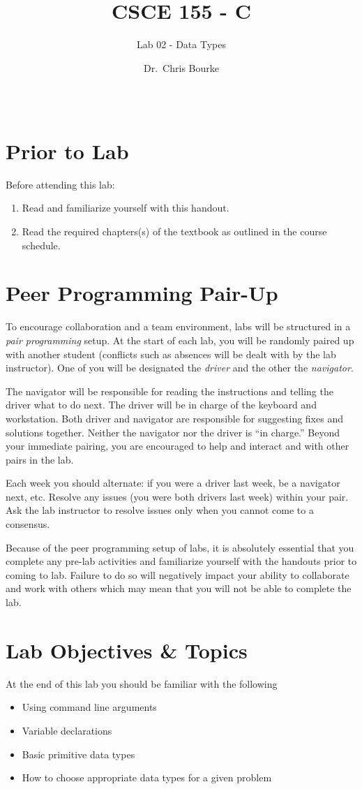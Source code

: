 \documentclass[12pt]{scrartcl}
\title{CSCE 155 - C}
\subtitle{Lab 02 - Data Types}
\author{Dr.\ Chris Bourke}
\date{~}
\begin{document}
\maketitle

\section*{Prior to Lab}

Before attending this lab:
\begin{enumerate}
  \item Read and familiarize yourself with this handout.
  \item Read the required chapters(s) of the textbook as 
  outlined in the course schedule.
\end{enumerate}

\section*{Peer Programming Pair-Up}

To encourage collaboration and a team environment, labs will be
structured in a \emph{pair programming} setup.  At the start of
each lab, you will be randomly paired up with another student
(conflicts such as absences will be dealt with by the lab instructor).
One of you will be designated the \emph{driver} and the other
the \emph{navigator}.

The navigator will be responsible for reading the instructions and
telling the driver what to do next.  The driver will be in charge of the
keyboard and workstation.  Both driver and navigator are responsible
for suggesting fixes and solutions together.  Neither the navigator
nor the driver is ``in charge.''  Beyond your immediate pairing, you
are encouraged to help and interact and with other pairs in the lab.

Each week you should alternate: if you were a driver last week,
be a navigator next, etc.  Resolve any issues (you were both drivers
last week) within your pair.  Ask the lab instructor to resolve issues
only when you cannot come to a consensus.

Because of the peer programming setup of labs, it is absolutely
essential that you complete any pre-lab activities and familiarize
yourself with the handouts prior to coming to lab.  Failure to do
so will negatively impact your ability to collaborate and work with
others which may mean that you will not be able to complete the
lab.

\section{Lab Objectives \& Topics}
At the end of this lab you should be familiar with the following
\begin{itemize}
  \item Using command line arguments
  \item Variable declarations
  \item Basic primitive data types
  \item How to choose appropriate data types for a given problem
\end{itemize}
\end{document}

